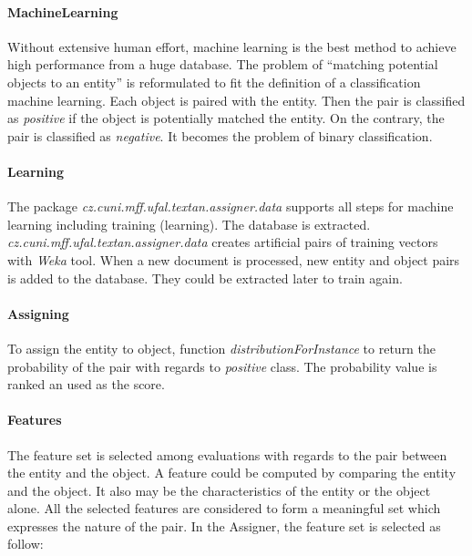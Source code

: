 
\paragraph{MachineLearning}
Without extensive human effort, machine learning is the best method to achieve
high performance from a huge database. The problem of ``matching potential objects
to an entity'' is reformulated to fit the definition of a classification machine 
learning. Each object is paired with the entity. Then the pair is classified as
\emph{positive} if the object is potentially matched the entity. On the contrary,
the pair is classified as \emph{negative}. It becomes the problem of binary 
classification.

\paragraph{Learning}
The package \emph{cz.cuni.mff.ufal.textan.assigner.data} supports all steps for
machine learning including training (learning). The database is extracted. 
\emph{cz.cuni.mff.ufal.textan.assigner.data} creates 
artificial pairs of training vectors with \textit{Weka} tool. When a new document is
processed, new entity and object pairs is added to the database. They could be extracted
later to train again.

\paragraph{Assigning}
To assign the entity to object, function \emph{distributionForInstance} to return the 
probability of the pair with regards to \emph{positive} class. The probability value 
is ranked an used as the score.

\paragraph{Features}

The feature set is selected among evaluations with regards to the pair between
the entity and the object. A feature could be computed by comparing the entity 
and the object. It also may be the characteristics of the entity or the object 
alone. All the selected features are considered to form a meaningful set which
expresses the nature of the pair. In the Assigner, the feature set is selected 
as follow:

